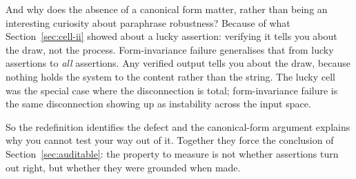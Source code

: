 And why does the absence of a canonical form matter, rather than being an
interesting curiosity about paraphrase robustness? Because of what
Section~\ref{sec:cell-ii} showed about a lucky assertion: verifying it tells you
about the draw, not the process. Form-invariance failure generalises that from
lucky assertions to \emph{all} assertions. Any verified output tells you about the
draw, because nothing holds the system to the content rather than the string. The
lucky cell was the special case where the disconnection is total; form-invariance
failure is the same disconnection showing up as instability across the input space.

So the redefinition identifies the defect and the canonical-form argument explains
why you cannot test your way out of it. Together they force the conclusion of
Section~\ref{sec:auditable}: the property to measure is not whether assertions turn
out right, but whether they were grounded when made.
